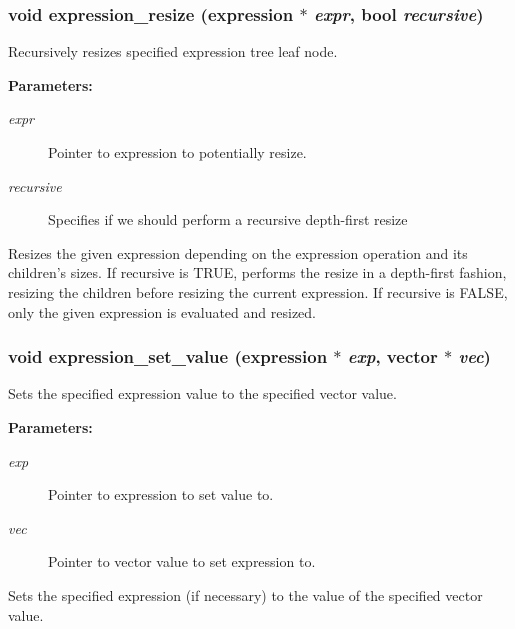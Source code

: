 \subsubsection{\setlength{\rightskip}{0pt plus 5cm}void expression\_\-resize ({\bf expression} $\ast$ {\em expr}, {\bf bool} {\em recursive})}\label{expr_8h_a3}


Recursively resizes specified expression tree leaf node.

\begin{Desc}
\item[{\bf Parameters: }]\par
\begin{description}
\item[
{\em expr}]Pointer to expression to potentially resize. \item[
{\em recursive}]Specifies if we should perform a recursive depth-first resize

\end{description}
\end{Desc}
Resizes the given expression depending on the expression operation and its children's sizes. If recursive is TRUE, performs the resize in a depth-first fashion, resizing the children before resizing the current expression. If recursive is FALSE, only the given expression is evaluated and resized. 
\subsubsection{\setlength{\rightskip}{0pt plus 5cm}void expression\_\-set\_\-value ({\bf expression} $\ast$ {\em exp}, {\bf vector} $\ast$ {\em vec})}\label{expr_8h_a2}


Sets the specified expression value to the specified vector value.

\begin{Desc}
\item[{\bf Parameters: }]\par
\begin{description}
\item[
{\em exp}]Pointer to expression to set value to. \item[
{\em vec}]Pointer to vector value to set expression to.

\end{description}
\end{Desc}
Sets the specified expression (if necessary) to the value of the specified vector value. 